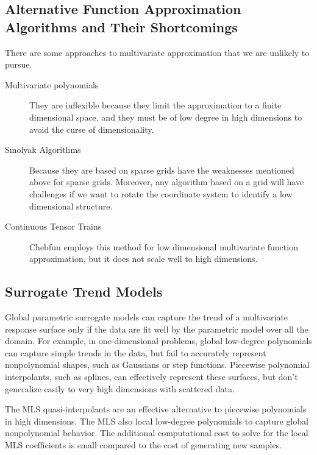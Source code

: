 \documentclass[11pt]{NSFamsart}
\begin{document}
\subsection{Alternative Function Approximation Algorithms and Their Shortcomings} \label{sec:shortAlgo}

There are some approaches to multivariate approximation that we are unlikely to pursue.  
\begin{description}
\item[Multivariate polynomials] They are inflexible because they limit the approximation to a finite dimensional space, and they must be of low degree in high dimensions to avoid the curse of dimensionality.
\item[Smolyak Algorithms \cite{BunGrie04a}] Because they are based on sparse grids have the weaknesses mentioned above for sparse grids.  Moreover, any algorithm based on a grid will have challenges if we want to rotate the coordinate system to identify a low dimensional structure.
\item[Continuous Tensor Trains \cite{GorKarMar19a}] Chebfun \cite{DriHalTre14a} employs this method for low dimensional multivariate function approximation, but it does not scale well to high dimensions.
\end{description}

\subsection{Surrogate Trend Models} \label{sec:ourtrend}
Global parametric surrogate models can capture the trend of a multivariate response surface only if the data are fit well by the parametric model over all the domain. For example, in one-dimensional problems, global low-degree polynomials can capture simple trends in the data, but fail to accurately represent nonpolynomial shapes, such as Gaussians or step functions. Piecewise polynomial interpolants, such as splines, can effectively represent these surfaces, but don't generalize easily to very high dimensions with scattered data. 

The MLS quasi-interpolants are an effective alternative to piecewise polynomials in high dimensions. The MLS also local low-degree polynomials to capture global nonpolynomial behavior. The additional computational cost to solve for the local MLS coefficients is small compared to the cost of generating new samples. 
\end{document}
